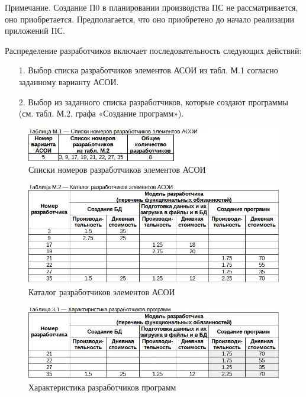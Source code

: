 \documentclass[12pt, a4paper, simple]{eskdtext}
\begin{document}
    Примечание. Создание П0 в планировании производства ПС не рассматривается, оно приобретается. Предполагается, что оно приобретено до начало реализации приложений ПС.
    
    Распределение разработчиков включает последовательность следующих действий:
    \begin{enumerate}
        \item[1.] Выбор списка разработчиков элементов АСОИ из табл. М.1 согласно заданному варианту АСОИ.
        \item[2.] Выбор из заданного списка разработчиков, которые создают программы (см. табл. М.2, графа «Создание программ»).
    \end{enumerate}

    \begin{figure}[h!]
        \centering
        \includegraphics[]
            {_docs/ТаблицаМ1СпискиНомеровРазработчиковЭлементовАСОИ.jpg}
        \caption{Списки номеров разработчиков элементов АСОИ}
    \end{figure}

    \begin{figure}[h!]
        \centering
        \includegraphics[width=16cm]
            {_docs/ТаблицаМ2КаталогРазработчиковЭлементовАСОИ.jpg}
        \caption{Каталог разработчиков элементов АСОИ}
    \end{figure}

    \begin{figure}[h!]
        \centering
        \includegraphics[width=16cm]
            {_docs/Таблица3-1ХарактеристикаРазработчиковПрограмм.jpg}
        \caption{Характеристика разработчиков программ}
    \end{figure}
\end{document}
